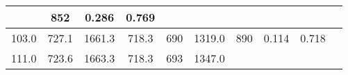 \documentclass[a4paper,10pt]{article}
\begin{document}
\begin{longtable}{
     |
%    
    c|
%    
    c|
%    
    c|
%    
    c|
%    
    c|
%    
    c|
%    
    c|
%    
    c|
%    
    c|
%    
    c|
%    
    }
%        
        & 852
%        

%        

%        
        & 0.286
%        

%        

%        
        & 0.769
%        

%        
        \\
        \hline

        

%        

%        
        103.0
%        

%        

%        
        & 727.1
%        

%        

%        
        & 1661.3
%        

%        

%        
        & 718.3
%        

%        

%        
        & 690
%        

%        

%        
        & 1319.0
%        

%        

%        
        & 890
%        

%        

%        
        & 0.114
%        

%        

%        
        & 0.718
%        

%        
        \\
        \hline

        

%        

%        
        111.0
%        

%        

%        
        & 723.6
%        

%        

%        
        & 1663.3
%        

%        

%        
        & 718.3
%        

%        

%        
        & 693
%        

%        

%        
        & 1347.0
%        

%        


\end{longtable}
\end{document}
